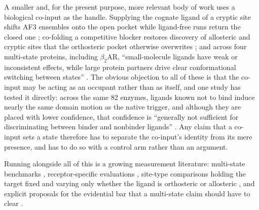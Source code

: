 A smaller and, for the present purpose, more relevant body of work uses a biological co-input as
the handle. Supplying the cognate ligand of a cryptic site shifts AF3 ensembles onto the open
pocket while ligand-free runs return the closed one \citep{lazou2026cryptic}; co-folding a competitive
blocker restores discovery of allosteric and cryptic sites that the orthosteric pocket otherwise
overwrites \citep{purnomo2026cafe}; and across four multi-state proteins, including $\beta_2$AR,
``small-molecule ligands have weak or inconsistent effects, while large protein partners drive clear
conformational switching between states'' \citep[p.~2]{ye2026multistatebias}. The obvious objection to all of
these is that the co-input may be acting as an occupant rather than as itself, and one study has
tested it directly: across the same 82 enzymes, ligands known not to bind induce nearly the same
domain motion as the native trigger, and although they are placed with lower confidence, that
confidence is ``generally not sufficient for discriminating between binder and nonbinder ligands''
\citep[Significance]{yu2026domainmotion}. Any claim that a co-input sets a state therefore has to
separate the co-input's identity from its mere presence, and has to do so with a control arm rather
than an argument.

Running alongside all of this is a growing measurement literature: multi-state benchmarks \citep{ku2026promise,sun2026kinconfbench},
receptor-specific evaluations \citep{chib2025gpcrstates,zhang2026generalization,obendorf2026statespecific}, site-type comparisons holding the target fixed and varying only
whether the ligand is orthosteric or allosteric \citep{nittinger2025cofolding}, and explicit proposals
for the evidential bar that a multi-state claim should have to clear \citep{chakravarty2026statespace,liu2026ensembletests}.

